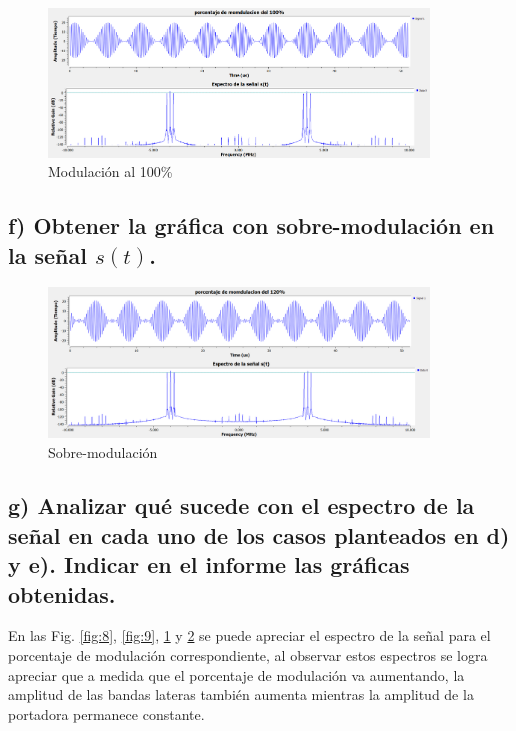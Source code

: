 \begin{figure}[H]
    \centering
    \includegraphics[width=0.9\textwidth]{imagenes/Parte_1/Actividad_6/modulacion_al_100.png}
    \caption{Modulación al 100\%}
    \label{fig:10}
\end{figure}


\subsection*{f) Obtener la gráfica con sobre-modulación en la señal $s(t)$.}

\begin{figure}[H]
    \centering
    \includegraphics[width=0.9\textwidth]{imagenes/Parte_1/Actividad_6/sobremodulacion.png}
    \caption{Sobre-modulación}
    \label{fig:11}
\end{figure}

\subsection*{g) Analizar qué sucede con el espectro de la señal en cada uno de los casos planteados en d) y e). Indicar en el informe las gráficas obtenidas.}

En las Fig. \ref{fig:8}, \ref{fig:9}, \ref{fig:10} y \ref{fig:11} se puede apreciar el espectro de la señal para el porcentaje de modulación correspondiente, al observar estos espectros se logra apreciar que a medida que el porcentaje de modulación va aumentando, la amplitud de las bandas lateras también aumenta mientras la amplitud de la portadora permanece constante.

